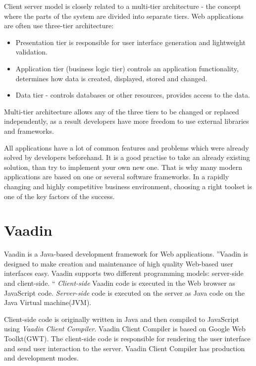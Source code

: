     	Client server model is closely related to a multi-tier architecture - the
    	concept where the parts of the system are divided into separate tiers. Web applications
    	 are often use three-tier architecture:
    	 \begin{itemize}
    	   \item Presentation tier is responsible for user interface generation and
    	   lightweight validation.
    	   \item Application tier (business logic tier) controls an application
    	   functionality, determines how data is created, displayed, stored and
    	   changed.
    	   \item Data tier - controls databases or other resources, provides access
    	   to the data.
    	 \end{itemize}
    	Multi-tier architecture allows any of the three tiers to be changed or
    	replaced independently, as a result developers have more freedom to use
    	external libraries and frameworks.
		
		All	applications have a lot of common features and problems which were already
		solved by developers beforehand. It is a good practise to take an already
		existing solution, than try to implement your own new one. That is why many
		modern applications are based on one or several software frameworks. In a
		rapidly changing and highly competitive business environment, choosing a right toolset is one of
		the key factors of the success.	 	
		
  \section{Vaadin}
  \label{ch:vaadin}
    Vaadin is a Java-based development framework for Web applications. ''Vaadin
    is designed to make creation and maintenance of high quality Web-based user interfaces easy.
   Vaadin supports two different programming models: server-side and client-side. 
   `` \cite[pr1.1]{bookVaaidn}
   \emph{Client-side} Vaadin code is executed in the Web browser as JavaScript
   code.
   \emph{Server-side} code is executed on the server as Java code on the Java
   Virtual machine(JVM).

   Client-side code is originally written in Java and then
   compiled to JavaScript using \emph{Vaadin Client Compiler}. Vaadin Client Compiler is based on Google
   Web Toolkt(GWT). The client-side code is responsible for rendering
   the user interface and send user interaction to the server. Vaadin Client
   Compiler has production and development modes. 
   
